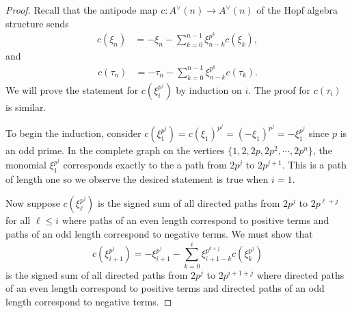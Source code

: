 \documentclass{amsart}
\theoremstyle{definition}
\theoremstyle{plain}
\numberwithin{theorem}{section}
\numberwithin{equation}{section}
\numberwithin{figure}{section}
\newcommand{\0}{\langle 0 \rangle }
\begin{document}
\begin{proof}
Recall that the antipode map $c: A^\vee (n) \to A^\vee (n)$ of the Hopf algebra structure sends
\begin{align*}
    c(\xi_n) & = - \xi_n - \sum_{k = 0}^{n - 1} \xi_{n - k}^{p^k} c (\xi_k),
\end{align*}
and
\begin{align*}
    c(\tau_n) & = - \tau_n - \sum_{k = 0}^{ n - 1} \xi_{n - k}^{p^k} c(\tau_k).
\end{align*}
We will prove the statement for $c(\xi_i^{p^j})$ by induction on $i$. The proof for $c(\tau_i)$ is similar. 

To begin the induction, consider $c(\xi_1^{p^j}) = c(\xi_1)^{p^j} = (-\xi_1)^{p^j} = - \xi_1^{p^j}$ since $p$ is an odd prime. In the  complete graph on the vertices $\{1,2, 2p , 2p^2, \cdots, 2p^n\}$, the monomial $\xi_1^{p^j}$ corresponds exactly to the a path from $2p^j$ to $2p^{j + 1}$.\color{black} This is a path of length one so we observe the desired statement is true when $i = 1$. 

Now suppose $c(\xi_\ell^{p^j})$ is the signed sum of all directed paths from $2{p^j}$ to $2 p^{\ell + j}$ for all $\ell \leq i$ where paths of an even length correspond to positive terms and paths of an odd length correspond to negative terms. We must show that 
\begin{equation} \label{eq:conj}
c(\xi_{i + 1}^{p^j}) = - \xi_{i + 1}^{p^j} - \sum_{k = 0}^{i} \xi_{i + 1 - k}^{p^{k + j}} c(\xi_k^{p^j})
\end{equation}
is the signed sum of all directed paths from $2p^j$ to $2p^{i + 1 + j}$ where directed paths of an even length correspond to positive terms and directed paths of an odd length correspond to negative terms.


\end{proof}
\end{document}
